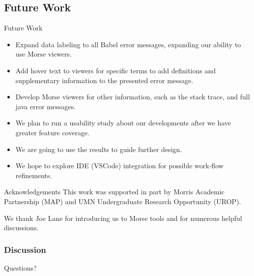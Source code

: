 \documentclass{beamer}
\begin{document}
\subsection{Future Work}
\begin{frame}{Future Work}
  \begin{itemize}
    \item<1-> Expand data labeling to all Babel error messages, expanding our ability to use Morse viewers.
    \item<2-> Add hover text to viewers for specific terms to add definitions and supplementary information to the presented error message.
    \item<3-> Develop Morse viewers for other information, such as the stack trace, and full java error messages.
    \item<4-> We plan to run a usability study about our developments after we have greater feature coverage.
    \item<5-> We are going to use the results to guide further design.
    \item<6-> We hope to explore IDE (VSCode) integration for possible work-flow refinements.
  \end{itemize}
  \end{frame}

\begin{frame}{Acknowledgements}
This work was supported in part by Morris Academic Partnership (MAP) and UMN Undergraduate Research Opportunity (UROP).  \\ 

\vspace*{0.2in}

We thank Joe Lane for introducing us to Morse tools and for numerous helpful discussions.
\end{frame}

\begin{frame}
  \frametitle{Discussion}
Questions?
\end{frame}
\end{document}
